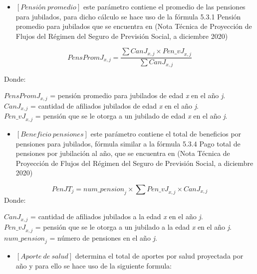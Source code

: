 \documentclass[
  letterpaper,
  DIV=11,
  numbers=noendperiod]{scrreprt}
\providecommand{\tightlist}{%
  \setlength{\itemsep}{0pt}\setlength{\parskip}{0pt}}\usepackage{longtable,booktabs,array}
\begin{document}
\begin{itemize}
\tightlist
\item
  \([Pensión\ promedio]\) este parámetro contiene el promedio de las
  pensiones para jubilados, para dicho cálculo se hace uso de la fórmula
  5.3.1 Pensión promedio para jubilados que se encuentra en (Nota
  Técnica de Proyección de Flujos del Régimen del Seguro de Previsión
  Social, a diciembre 2020)
\end{itemize}

\begin{equation}
{PensPromJ}_{x,j}= \frac{\sum{CanJ_{x,j}\times Pen{\_vJ}_{x,j}}}{\sum{CanJ_{x,j}}}
\end{equation}

Donde:

\({PensPromJ}_{x,j}\) = pensión promedio para jubilados de edad \emph{x}
en el año \emph{j}.\\
\(CanJ_{x,j}\) = cantidad de afiliados jubilados de edad \emph{x} en el
año \emph{j}.\\
\(Pen{\_vJ}_{x,j}\) = pensión que se le otorga a un jubilado de edad
\emph{x} en el año \emph{j}.

\begin{itemize}
\tightlist
\item
  \([Beneficio\ pensiones]\) este parámetro contiene el total de
  beneficios por pensiones para jubilados, fórmula similar a la fórmula
  5.3.4 Pago total de pensiones por jubilación al año, que se encuentra
  en (Nota Técnica de Proyección de Flujos del Régimen del Seguro de
  Previsión Social, a diciembre 2020)
\end{itemize}

\begin{equation}
{PenJT}_j={num\_pension}_j\times\sum{{Pen\_vJ}_{x,j}\times {CanJ}_{x,j}}
\label{eq:penjt}
\end{equation} Donde:

\(CanJ_{x,j}\) = cantidad de afiliados jubilados a la edad \emph{x} en
el año \emph{j}.\\
\(Pen{\_vJ}_{x,j}\) = pensión que se le otorga a un jubilado a la edad
\emph{x} en el año \emph{j}.\\
\({num\_pension}_j\) = número de pensiones en el año \emph{j}.

\begin{itemize}
\tightlist
\item
  \([Aporte\ de\ salud]\) determina el total de aportes por salud
  proyectada por año y para ello se hace uso de la siguiente formula:
\end{itemize}
\end{document}
